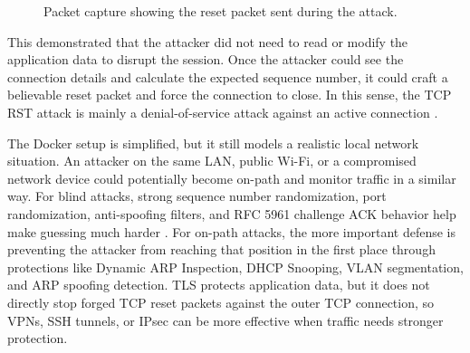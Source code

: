 \begin{figure}[!t]
\centering
{}
\caption{Packet capture showing the reset packet sent during the attack.}
\label{fig:rst_verify3}
\end{figure}

This demonstrated that the attacker did not need to read or modify the application data to disrupt the session. Once the attacker could see the connection details and calculate the expected sequence number, it could craft a believable reset packet and force the connection to close. In this sense, the TCP RST attack is mainly a denial-of-service attack against an active connection \cite{heaton2020}.

The Docker setup is simplified, but it still models a realistic local network situation. An attacker on the same LAN, public Wi-Fi, or a compromised network device could potentially become on-path and monitor traffic in a similar way. For blind attacks, strong sequence number randomization, port randomization, anti-spoofing filters, and RFC 5961 challenge ACK behavior help make guessing much harder \cite{rfc5961}. For on-path attacks, the more important defense is preventing the attacker from reaching that position in the first place through protections like Dynamic ARP Inspection, DHCP Snooping, VLAN segmentation, and ARP spoofing detection. TLS protects application data, but it does not directly stop forged TCP reset packets against the outer TCP connection, so VPNs, SSH tunnels, or IPsec can be more effective when traffic needs stronger protection.
